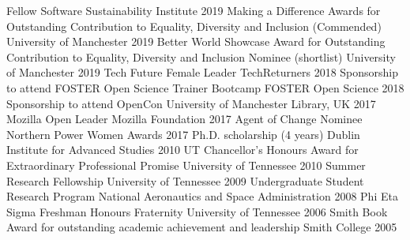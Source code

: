 \begin{cvpress}
 \cvpres
    {Fellow}
    {Software Sustainability Institute}
    {2019}
 \cvpres
    {Making a Difference Awards for Outstanding Contribution to Equality, Diversity and Inclusion (Commended)}
    {University of Manchester}
    {2019}
 \cvpres
    {Better World Showcase Award for Outstanding Contribution to Equality, Diversity and Inclusion Nominee (shortlist)}
    {University of Manchester}
    {2019}
 \cvpres
    {Tech Future Female Leader}
    {TechReturners}
    {2018}
 \cvpres
    {Sponsorship to attend FOSTER Open Science Trainer Bootcamp}
    {FOSTER Open Science}
    {2018}
 \cvpres
    {Sponsorship to attend OpenCon}
    {University of Manchester Library, UK}
    {2017}
 \cvpres
    {Mozilla Open Leader}
    {Mozilla Foundation}
    {2017}
  \cvpres
    {Agent of Change Nominee}
    {Northern Power Women Awards}
    {2017}  
    \cvpres
    {Ph.D. scholarship (4 years)}
    {Dublin Institute for Advanced Studies}
    {2010}
  \cvpres
    {UT Chancellor's Honours Award for Extraordinary Professional Promise}
    {University of Tennessee}
    {2010}
  \cvpres
    {Summer Research Fellowship}
    {University of Tennessee}
    {2009}
  \cvpres
    {Undergraduate Student Research Program}
    {National Aeronautics and Space Administration}
    {2008}
  \cvpres
    {Phi Eta Sigma Freshman Honours Fraternity}
    {University of Tennessee}
    {2006}
  \cvpres
    {Smith Book Award for outstanding academic achievement and leadership}
    {Smith College}
    {2005}
\end{cvpress}

